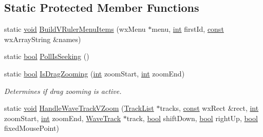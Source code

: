 \subsection*{Static Protected Member Functions}
\begin{DoxyCompactItemize}
\item 
static \hyperlink{sound_8c_ae35f5844602719cf66324f4de2a658b3}{void} \hyperlink{class_track_panel_a6706d07cc464d81bf05575a1f3028644}{Build\+V\+Ruler\+Menu\+Items} (wx\+Menu $\ast$menu, \hyperlink{xmltok_8h_a5a0d4a5641ce434f1d23533f2b2e6653}{int} first\+Id, \hyperlink{getopt1_8c_a2c212835823e3c54a8ab6d95c652660e}{const} wx\+Array\+String \&names)
\item 
static \hyperlink{mac_2config_2i386_2lib-src_2libsoxr_2soxr-config_8h_abb452686968e48b67397da5f97445f5b}{bool} \hyperlink{class_track_panel_a17b626c88077b5c998567797bbda9722}{Poll\+Is\+Seeking} ()
\item 
static \hyperlink{mac_2config_2i386_2lib-src_2libsoxr_2soxr-config_8h_abb452686968e48b67397da5f97445f5b}{bool} \hyperlink{class_track_panel_a2fd64dc9fb162d0ec44b10e05f5e562b}{Is\+Drag\+Zooming} (\hyperlink{xmltok_8h_a5a0d4a5641ce434f1d23533f2b2e6653}{int} zoom\+Start, \hyperlink{xmltok_8h_a5a0d4a5641ce434f1d23533f2b2e6653}{int} zoom\+End)
\begin{DoxyCompactList}\small\item\em Determines if drag zooming is active. \end{DoxyCompactList}\item 
static \hyperlink{sound_8c_ae35f5844602719cf66324f4de2a658b3}{void} \hyperlink{class_track_panel_a7feaaf7ca9539aed78d76cc560dc1e7c}{Handle\+Wave\+Track\+V\+Zoom} (\hyperlink{class_track_list}{Track\+List} $\ast$tracks, \hyperlink{getopt1_8c_a2c212835823e3c54a8ab6d95c652660e}{const} wx\+Rect \&rect, \hyperlink{xmltok_8h_a5a0d4a5641ce434f1d23533f2b2e6653}{int} zoom\+Start, \hyperlink{xmltok_8h_a5a0d4a5641ce434f1d23533f2b2e6653}{int} zoom\+End, \hyperlink{class_wave_track}{Wave\+Track} $\ast$track, \hyperlink{mac_2config_2i386_2lib-src_2libsoxr_2soxr-config_8h_abb452686968e48b67397da5f97445f5b}{bool} shift\+Down, \hyperlink{mac_2config_2i386_2lib-src_2libsoxr_2soxr-config_8h_abb452686968e48b67397da5f97445f5b}{bool} right\+Up, \hyperlink{mac_2config_2i386_2lib-src_2libsoxr_2soxr-config_8h_abb452686968e48b67397da5f97445f5b}{bool} fixed\+Mouse\+Point)
\end{DoxyCompactItemize}
